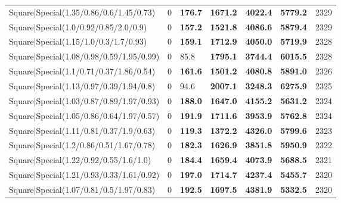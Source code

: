 \begin{tabular}{lrllllr}
 Square|Special(1.35/0.86/0.6/1.45/0.73)                       &             0   & \textbf{176.7} & \textbf{1671.2} & \textbf{4022.4} & \textbf{5779.2} &         2329 \\
 Square|Special(1.0/0.92/0.85/2.0/0.9)                         &             0   & \textbf{157.2} & \textbf{1521.8} & \textbf{4086.6} & \textbf{5879.4} &         2329 \\
 Square|Special(1.15/1.0/0.3/1.7/0.93)                         &             0   & \textbf{159.1} & \textbf{1712.9} & \textbf{4050.0} & \textbf{5719.9} &         2328 \\
 Square|Special(1.08/0.98/0.59/1.95/0.99)                      &             0   & 85.8           & \textbf{1795.1} & \textbf{3744.4} & \textbf{6015.5} &         2328 \\
 Square|Special(1.1/0.71/0.37/1.86/0.54)                       &             0   & \textbf{161.6} & \textbf{1501.2} & \textbf{4080.8} & \textbf{5891.0} &         2326 \\
 Square|Special(1.13/0.97/0.39/1.94/0.8)                       &             0   & 94.6           & \textbf{2007.1} & \textbf{3248.3} & \textbf{6275.9} &         2325 \\
 Square|Special(1.03/0.87/0.89/1.97/0.93)                      &             0   & \textbf{188.0} & \textbf{1647.0} & \textbf{4155.2} & \textbf{5631.2} &         2324 \\
 Square|Special(1.05/0.86/0.64/1.97/0.57)                      &             0   & \textbf{191.9} & \textbf{1711.6} & \textbf{3953.9} & \textbf{5762.8} &         2324 \\
 Square|Special(1.11/0.81/0.37/1.9/0.63)                       &             0   & \textbf{119.3} & \textbf{1372.2} & \textbf{4326.0} & \textbf{5799.6} &         2323 \\
 Square|Special(1.2/0.86/0.51/1.67/0.78)                       &             0   & \textbf{182.3} & \textbf{1626.9} & \textbf{3851.8} & \textbf{5950.9} &         2322 \\
 Square|Special(1.22/0.92/0.55/1.6/1.0)                        &             0   & \textbf{184.4} & \textbf{1659.4} & \textbf{4073.9} & \textbf{5688.5} &         2321 \\
 Square|Special(1.21/0.93/0.33/1.61/0.92)                      &             0   & \textbf{197.0} & \textbf{1714.7} & \textbf{4237.4} & \textbf{5455.7} &         2320 \\
 Square|Special(1.07/0.81/0.5/1.97/0.83)                       &             0   & \textbf{192.5} & \textbf{1697.5} & \textbf{4381.9} & \textbf{5332.5} &         2320 \\

\end{tabular}
